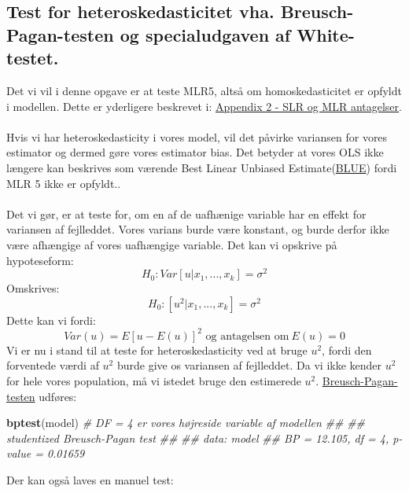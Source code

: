 \documentclass[
  10pt,
]{article}
\newenvironment{Shaded}{\begin{snugshade}}{\end{snugshade}}
\newcommand{\CommentTok}[1]{\textcolor[rgb]{0.56,0.35,0.01}{\textit{#1}}}
\newcommand{\KeywordTok}[1]{\textcolor[rgb]{0.13,0.29,0.53}{\textbf{#1}}}
\newcommand{\NormalTok}[1]{#1}
\begin{document}
\hypertarget{test-for-heteroskedasticitet-vha.-breusch-pagan-testen-og-specialudgaven-af-white-testet.}{%
\subsection{Test for heteroskedasticitet vha. Breusch-Pagan-testen og
specialudgaven af
White-testet.}\label{test-for-heteroskedasticitet-vha.-breusch-pagan-testen-og-specialudgaven-af-white-testet.}}

\leavevmode

Det vi vil i denne opgave er at teste MLR5, altså om homoskedasticitet
er opfyldt i modellen. Dette er yderligere beskrevet i:
\hyperref[sec:SLR]{Appendix 2 - SLR og MLR antagelser}.\\
~\\
Hvis vi har heteroskedasticity i vores model, vil det påvirke variansen
for vores estimator og dermed gøre vores estimator bias. Det betyder at
vores OLS ikke længere kan beskrives som værende Best Linear Unbiased
Estimate(\hyperref[sec:BLUE]{BLUE}) fordi MLR 5 ikke er opfyldt..\\
~\\
Det vi gør, er at teste for, om en af de uafhænige variable har en
effekt for variansen af fejlleddet. Vores varians burde være konstant,
og burde derfor ikke være afhængige af vores uafhængige variable. Det
kan vi opskrive på hypoteseform:\\
\[H_0:Var[u|x_1,...,x_k]=\sigma^2\] Omskrives:
\[H_0:[u^2|x_1,...,x_k]=\sigma^2\] Dette kan vi fordi:
\[Var(u)=E[u-E(u)]^2\text{ og antagelsen om}\ E(u)=0\] Vi er nu i stand
til at teste for heteroskedasticity ved at bruge \(u^2\), fordi den
forventede værdi af \(u^2\) burde give os variansen af fejlleddet. Da vi
ikke kender \(u^2\) for hele vores population, må vi istedet bruge den
estimerede \(u^2\). \newline 
\hyperref[sec:BP-test]{Breusch-Pagan-testen} udføres:

\begin{Shaded}
\begin{Highlighting}[]
\KeywordTok{bptest}\NormalTok{(model) }\CommentTok{# DF = 4 er vores højreside variable af modellen}
\CommentTok{## }
\CommentTok{##  studentized Breusch-Pagan test}
\CommentTok{## }
\CommentTok{## data:  model}
\CommentTok{## BP = 12.105, df = 4, p-value = 0.01659}
\end{Highlighting}
\end{Shaded}

Der kan også laves en manuel test:
\end{document}
